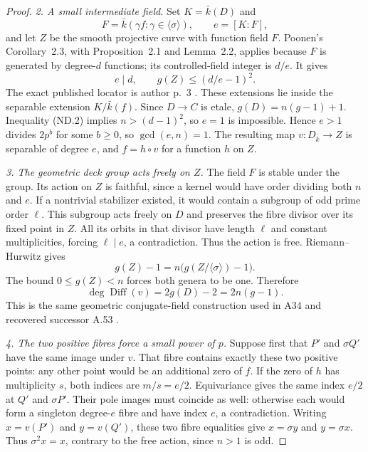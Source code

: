 \begin{proof}
\emph{2. A small intermediate field.}
Set $K=\bar k(D)$ and
\[
 F=\bar k(\gamma f:\gamma\in\langle\sigma\rangle),
 \qquad e=[K:F],
\]
and let $Z$ be the smooth projective curve with function field
$F$. Poonen's Corollary~2.3, with Proposition~2.1 and Lemma~2.2,
applies because $F$ is generated by degree-$d$ functions; its
controlled-field integer is $d/e$. It gives
\[
                    e\mid d,\qquad g(Z)\le(d/e-1)^2.
 \tag{ND.8}
\]
The exact published locator is author p.~3
\cite{Poonen2007Gonality}. These extensions lie inside the
separable extension $K/\bar k(f)$. Since $D\to C$ is etale,
$g(D)=n(g-1)+1$. Inequality (ND.2) implies $n>(d-1)^2$, so $e=1$
is impossible. Hence $e>1$ divides $2p^b$ for some $b\ge0$, so
$\gcd(e,n)=1$. The resulting
map $v:D_{\bar k}\to Z$ is separable of degree $e$, and
$f=h\circ v$ for a function $h$ on $Z$.

\emph{3. The geometric deck group acts freely on $Z$.}
The field $F$ is stable under the group. Its action on $Z$ is
faithful, since a kernel would have order dividing both $n$ and
$e$. If a nontrivial stabilizer existed, it would contain a
subgroup of odd prime order $\ell$. This subgroup acts freely
on $D$ and preserves the fibre divisor over its fixed point
in $Z$. All its orbits in that divisor have length $\ell$ and
constant multiplicities, forcing $\ell\mid e$, a contradiction.
Thus the action is free. Riemann--Hurwitz gives
\[
                    g(Z)-1=n\bigl(g(Z/\langle\sigma\rangle)-1\bigr).
\]
The bound $0\le g(Z)<n$ forces both genera to be one. Therefore
\[
                   \deg\operatorname{Diff}(v)=2g(D)-2=2n(g-1).
 \tag{ND.9}
\]
This is the same geometric conjugate-field construction used in
A34 and recovered successor A.53 \cite[A.53]{ASrun}.

\emph{4. The two positive fibres force a small power of $p$.}
Suppose first that $P'$ and $\sigma Q'$ have the same image
under $v$. That fibre contains exactly these two positive
points: any other point would be an additional zero of $f$.
If the zero of $h$ has multiplicity $s$, both indices are
$m/s=e/2$. Equivariance gives the same index $e/2$ at $Q'$
and $\sigma P'$. Their pole images must coincide as well:
otherwise each would form a singleton degree-$e$ fibre and
have index $e$, a contradiction. Writing $x=v(P')$ and
$y=v(Q')$, these two fibre equalities give
$x=\sigma y$ and $y=\sigma x$. Thus $\sigma^2x=x$, contrary
to the free action, since $n>1$ is odd.


\end{proof}

